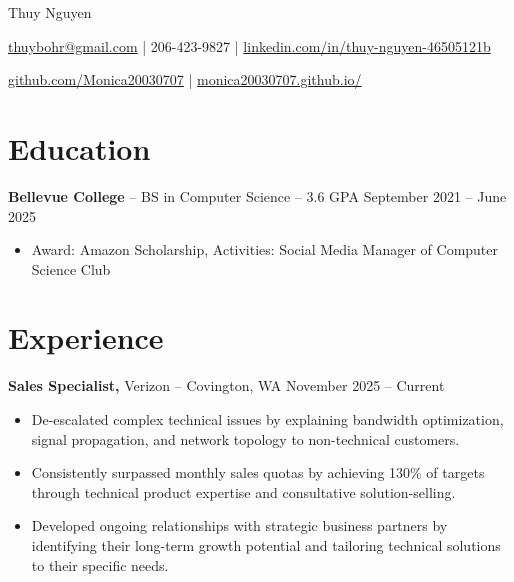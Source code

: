 \documentclass[11pt]{article}       %
\begin{document}
\centerline{\Huge Thuy Nguyen}

\vspace{5pt}

\centerline{\href{mailto:thuybohr@gmail.com}{thuybohr@gmail.com} | 206-423-9827 |
\href{https://www.linkedin.com/in/thuy-nguyen-46505121b/}{linkedin.com/in/thuy-nguyen-46505121b}}

\centerline{\href{https://github.com/Monica20030707}{github.com/Monica20030707} | 
\href{https://monica20030707.github.io/}{monica20030707.github.io/}} 

\vspace{-9pt}

\section*{Education}
\textbf{Bellevue College} -- BS in Computer Science -- 3.6 GPA \hfill September 2021 -- June 2025\\
\vspace{-9pt}
\begin{itemize}
  \item Award: Amazon Scholarship, Activities: Social Media Manager of Computer Science Club
\end{itemize}

\vspace{-18.5pt}

\section*{Experience}

\textbf{Sales Specialist,} {Verizon} -- Covington, WA \hfill November 2025 -- Current \\
\vspace{-9pt}
\begin{itemize}
  \item De-escalated complex technical issues by explaining bandwidth optimization, signal propagation, and network topology to non-technical customers.
  \item Consistently surpassed monthly sales quotas by achieving 130\% of targets through technical product expertise and consultative solution-selling.
  \item Developed ongoing relationships with strategic business partners by identifying their long-term growth potential and tailoring technical solutions to their specific needs.
\end{itemize}
\end{document}
